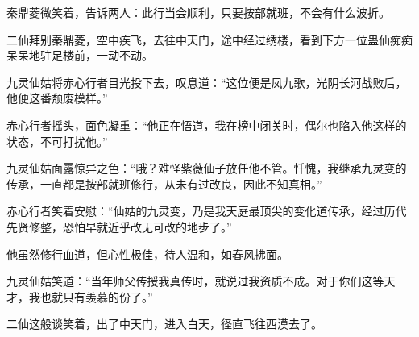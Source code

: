 \begin{this_body}
秦鼎菱微笑着，告诉两人：此行当会顺利，只要按部就班，不会有什么波折。

二仙拜别秦鼎菱，空中疾飞，去往中天门，途中经过绣楼，看到下方一位蛊仙痴痴呆呆地驻足楼前，一动不动。

九灵仙姑将赤心行者目光投下去，叹息道：“这位便是凤九歌，光阴长河战败后，他便这番颓废模样。”

赤心行者摇头，面色凝重：“他正在悟道，我在榜中闭关时，偶尔也陷入他这样的状态，不可打扰他。”

九灵仙姑面露惊异之色：“哦？难怪紫薇仙子放任他不管。忏愧，我继承九灵变的传承，一直都是按部就班修行，从未有过改良，因此不知真相。”

赤心行者笑着安慰：“仙姑的九灵变，乃是我天庭最顶尖的变化道传承，经过历代先贤修整，恐怕早就近乎改无可改的地步了。”

他虽然修行血道，但心性极佳，待人温和，如春风拂面。

九灵仙姑笑道：“当年师父传授我真传时，就说过我资质不成。对于你们这等天才，我也就只有羡慕的份了。”

二仙这般谈笑着，出了中天门，进入白天，径直飞往西漠去了。

\end{this_body}

